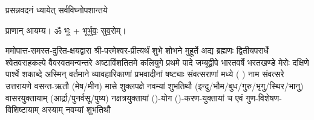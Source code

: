
\setlength{\parindent}{0pt}





{प्रसन्नवदनं ध्यायेत् सर्वविघ्नोपशान्तये}
 
प्राणान्  आयम्य।  ॐ भूः + भूर्भुवः॒ सुव॒रोम्।


ममोपात्त-समस्त-दुरित-क्षयद्वारा श्री-परमेश्वर-प्रीत्यर्थं शुभे शोभने मुहूर्ते अद्य ब्रह्मणः
द्वितीयपरार्धे श्वेतवराहकल्पे वैवस्वतमन्वन्तरे अष्टाविंशतितमे कलियुगे प्रथमे पादे
जम्बूद्वीपे भारतवर्षे भरतखण्डे मेरोः दक्षिणे पार्श्वे शकाब्दे अस्मिन् वर्तमाने व्यावहारिकाणां प्रभवादीनां षष्ट्याः संवत्सराणां मध्ये (	) नाम संवत्सरे उत्तरायणे वसन्त-ऋतौ  (मेष/मीन) मासे 
शुक्लपक्षे नवम्यां शुभतिथौ (इन्दु/भौम/बुध/गुरु/भृगु/स्थिर/भानु) वासरयुक्तायाम्
(आर्द्रा/पुनर्वसू/पुष्य) नक्षत्रयुक्तायां ()-योग ()-करण-युक्तायां च एवं गुण-विशेषण-विशिष्टायाम्
अस्याम् नवम्यां शुभतिथौ 

